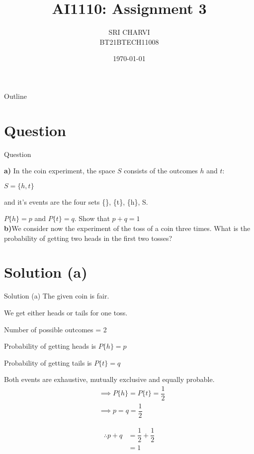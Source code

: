 \documentclass{beamer}
\title{AI1110: Assignment 3}
\author{SRI CHARVI\\BT21BTECH11008}
\date{\today}
\begin{document}
\begin{frame}
    \titlepage 
\end{frame}



\begin{frame}{Outline}
    \tableofcontents
\end{frame}


\section{Question}
\begin{frame}{Question}

\textbf{a)} In the coin experiment, the space $S$ consists of the outcomes $h$ and $t$:

\begin{center}
$S=\{h,t\}$
\end{center}


  and it's events are the four sets \{\emptyset\}, \{t\}, \{h\}, S. 
  
  $P\{h\}=p$ and $P\{t\}=q$. Show that $p+q=1$\\
  
  \textbf{b)}We consider now the experiment of the toss of a coin three times. What is the probability of getting two heads in the first two tosses?
\end{frame}
\section{Solution (a)}
\begin{frame}{Solution (a)}
	The given coin is fair.
	
	We get either heads or tails for one toss.
	
	Number of possible outcomes = 2 
	
	Probability of getting heads is $P\{h\}=p$
	
	Probability of getting tails is $P\{t\}=q$
	
	Both events are exhaustive, mutually exclusive and equally probable.
    \begin{align}
            &\implies  P\{h\}=  P\{t\}= \dfrac{1}{2}\\
            &\implies p=q=\dfrac{1}{2}
    \end{align}
    
    \begin{align}
        \therefore p+q &= \dfrac{1}{2}+\dfrac{1}{2}\\
            &=1
    \end{align}
\end{frame}
\end{document}

